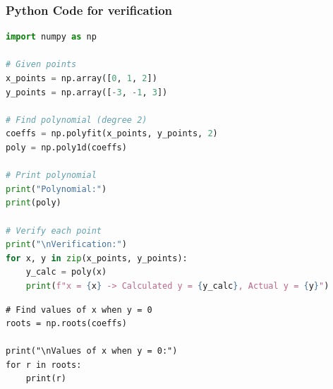 \documentclass{beamer}
\theoremstyle{remark}
\numberwithin{equation}{section}
\numberwithin{equation}{section}
\begin{document}
\begin{frame}[fragile]
\frametitle{Python Code for verification}
\begin{lstlisting}[language=Python]
import numpy as np

# Given points
x_points = np.array([0, 1, 2])
y_points = np.array([-3, -1, 3])

# Find polynomial (degree 2)
coeffs = np.polyfit(x_points, y_points, 2)
poly = np.poly1d(coeffs)

# Print polynomial
print("Polynomial:")
print(poly)

# Verify each point
print("\nVerification:")
for x, y in zip(x_points, y_points):
    y_calc = poly(x)
    print(f"x = {x} -> Calculated y = {y_calc}, Actual y = {y}")

\end{lstlisting}
\end{frame}
\begin{frame}[fragile]
\begin{lstlisting}
# Find values of x when y = 0
roots = np.roots(coeffs)

print("\nValues of x when y = 0:")
for r in roots:
    print(r)

\end{lstlisting}
\end{frame}
\end{document}
